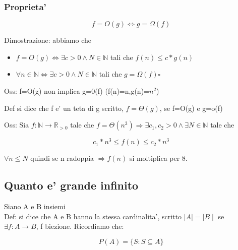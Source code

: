 \documentclass{article}
\begin{document}
        \subsubsection{Proprieta'}
        \begin{equation*}
          f=O(g) \iff g=\Omega(f)
        \end{equation*}
        \begin{flushleft}
          Dimostrazione: abbiamo che 
        \end{flushleft}
        \begin{itemize}
          \item $f=O(g) \iff \exists c>0 \land N \in \mathbb{N}$ tali che $f(n) \leq c*g(n)$
          \item $\forall n \in \mathbb{N} \iff \exists c>0 \land N \in \mathbb{N}$ tali che $g=\Omega(f) \square$
        \end{itemize}
        \begin{flushleft}
          Oss: f=O(g) non implica g=0(f) (f(n)=n,g(n)=$n^2$)
        \end{flushleft}
        \begin{flushleft}
          Def si dice che f e' un teta di g scritto, $f=\Theta(g)$, se f=O(g) e g=o(f)
        \end{flushleft}
        \begin{flushleft}
          Oss: Sia $f: \mathbb{N} \to \mathbb{R}_{>0}$ tale che $f=\Theta(n^3) \Rightarrow \exists c_1,c_2>0 \land \exists N \in \mathbb{N}$ tale che
        \end{flushleft}
        \begin{equation*}
          c_1*n^3 \leq f(n) \leq c_2*n^3
        \end{equation*}
        \begin{flushleft}
          $\forall n\leq N$ quindi se n radoppia $\Rightarrow f(n)$ si moltiplica per 8.
        \end{flushleft}
        \subsection{Quanto e' grande infinito}
        \begin{flushleft}
          Siano A e B insiemi \\ 
          Def: si dice che A e B hanno la stessa cardinalita', scritto $\mid A \mid = \mid B \mid$ se $\exists f:A\to B$, f biezione. Ricordiamo che:
        \end{flushleft}
        \begin{equation*}
          P(A)=\{S: S\subseteq A\}
        \end{equation*}
\end{document}
